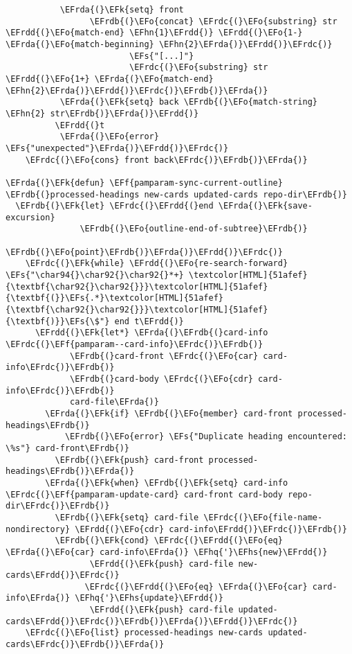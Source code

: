 \documentclass[a4wide,10pt]{article}
\newcommand{\EFs}[1]{\textcolor{EFs}{#1}} %
\newcommand{\EFk}[1]{\textcolor{EFk}{#1}} %
\newcommand{\EFf}[1]{\textcolor{EFf}{#1}} %
\newcommand{\EFo}[1]{\textcolor{EFo}{#1}} %
\newcommand{\EFhn}[1]{\textcolor{EFhn}{\textbf{#1}}} %
\newcommand{\EFhq}[1]{\textcolor{EFhq}{#1}} %
\newcommand{\EFhs}[1]{\textcolor{EFhs}{#1}} %
\newcommand{\EFrda}[1]{\textcolor{EFrda}{#1}} %
\newcommand{\EFrdb}[1]{\textcolor{EFrdb}{#1}} %
\newcommand{\EFrdc}[1]{\textcolor{EFrdc}{#1}} %
\newcommand{\EFrdd}[1]{\textcolor{EFrdd}{#1}} %
\begin{document}
\begin{Code}
\begin{Verbatim}
           \EFrda{(}\EFk{setq} front
                 \EFrdb{(}\EFo{concat} \EFrdc{(}\EFo{substring} str \EFrdd{(}\EFo{match-end} \EFhn{1}\EFrdd{)} \EFrdd{(}\EFo{1-} \EFrda{(}\EFo{match-beginning} \EFhn{2}\EFrda{)}\EFrdd{)}\EFrdc{)}
                         \EFs{"[...]"}
                         \EFrdc{(}\EFo{substring} str \EFrdd{(}\EFo{1+} \EFrda{(}\EFo{match-end} \EFhn{2}\EFrda{)}\EFrdd{)}\EFrdc{)}\EFrdb{)}\EFrda{)}
           \EFrda{(}\EFk{setq} back \EFrdb{(}\EFo{match-string} \EFhn{2} str\EFrdb{)}\EFrda{)}\EFrdd{)}
          \EFrdd{(}t
           \EFrda{(}\EFo{error} \EFs{"unexpected"}\EFrda{)}\EFrdd{)}\EFrdc{)}
    \EFrdc{(}\EFo{cons} front back\EFrdc{)}\EFrdb{)}\EFrda{)}

\EFrda{(}\EFk{defun} \EFf{pamparam-sync-current-outline} \EFrdb{(}processed-headings new-cards updated-cards repo-dir\EFrdb{)}
  \EFrdb{(}\EFk{let} \EFrdc{(}\EFrdd{(}end \EFrda{(}\EFk{save-excursion}
               \EFrdb{(}\EFo{outline-end-of-subtree}\EFrdb{)}
               \EFrdb{(}\EFo{point}\EFrdb{)}\EFrda{)}\EFrdd{)}\EFrdc{)}
    \EFrdc{(}\EFk{while} \EFrdd{(}\EFo{re-search-forward} \EFs{"\char94{}\char92{}\char92{}*+} \textcolor[HTML]{51afef}{\textbf{\char92{}\char92{}}}\textcolor[HTML]{51afef}{\textbf{(}}\EFs{.*}\textcolor[HTML]{51afef}{\textbf{\char92{}\char92{}}}\textcolor[HTML]{51afef}{\textbf{)}}\EFs{\$"} end t\EFrdd{)}
      \EFrdd{(}\EFk{let*} \EFrda{(}\EFrdb{(}card-info \EFrdc{(}\EFf{pamparam--card-info}\EFrdc{)}\EFrdb{)}
             \EFrdb{(}card-front \EFrdc{(}\EFo{car} card-info\EFrdc{)}\EFrdb{)}
             \EFrdb{(}card-body \EFrdc{(}\EFo{cdr} card-info\EFrdc{)}\EFrdb{)}
             card-file\EFrda{)}
        \EFrda{(}\EFk{if} \EFrdb{(}\EFo{member} card-front processed-headings\EFrdb{)}
            \EFrdb{(}\EFo{error} \EFs{"Duplicate heading encountered: \%s"} card-front\EFrdb{)}
          \EFrdb{(}\EFk{push} card-front processed-headings\EFrdb{)}\EFrda{)}
        \EFrda{(}\EFk{when} \EFrdb{(}\EFk{setq} card-info \EFrdc{(}\EFf{pamparam-update-card} card-front card-body repo-dir\EFrdc{)}\EFrdb{)}
          \EFrdb{(}\EFk{setq} card-file \EFrdc{(}\EFo{file-name-nondirectory} \EFrdd{(}\EFo{cdr} card-info\EFrdd{)}\EFrdc{)}\EFrdb{)}
          \EFrdb{(}\EFk{cond} \EFrdc{(}\EFrdd{(}\EFo{eq} \EFrda{(}\EFo{car} card-info\EFrda{)} \EFhq{'}\EFhs{new}\EFrdd{)}
                 \EFrdd{(}\EFk{push} card-file new-cards\EFrdd{)}\EFrdc{)}
                \EFrdc{(}\EFrdd{(}\EFo{eq} \EFrda{(}\EFo{car} card-info\EFrda{)} \EFhq{'}\EFhs{update}\EFrdd{)}
                 \EFrdd{(}\EFk{push} card-file updated-cards\EFrdd{)}\EFrdc{)}\EFrdb{)}\EFrda{)}\EFrdd{)}\EFrdc{)}
    \EFrdc{(}\EFo{list} processed-headings new-cards updated-cards\EFrdc{)}\EFrdb{)}\EFrda{)}


\end{Verbatim}
\end{Code}
\end{document}
